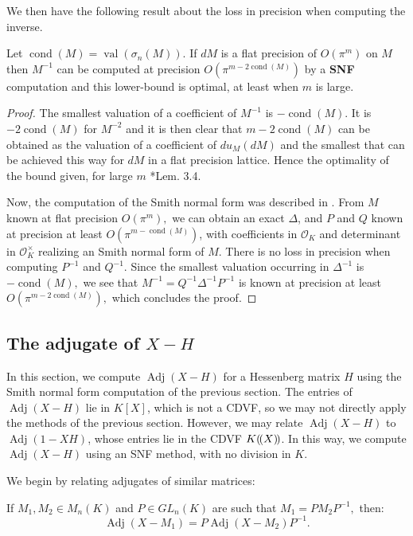 \documentclass{sig-alternate-05-2015}
\DeclareMathOperator{\val}{val}
\DeclareMathOperator{\adj}{Adj}
\DeclareMathOperator{\cond}{cond}
\newcommand{\OK}{\mathcal{O}_K}
\newcommand{\llp}{(\mkern-2.5mu(}
\newcommand{\rrp}{)\mkern-2.5mu)}
\begin{document}
We then have the following result about the loss in precision when computing the inverse.

\begin{prop}
Let $\cond(M) = \val(\sigma_n(M))$.
If $dM$ is a flat precision of $O(\pi^m)$ on $M$ then $M^{-1}$
can be computed at precision $O(\pi^{m-2\cond(M)})$ by a \textbf{SNF} computation
and this lower-bound is optimal,
at least when $m$ is large.
\end{prop}
\begin{proof}
The smallest valuation of a coefficient of $M^{-1}$ is $-\cond(M).$
It is $-2\cond(M)$ for $M^{-2}$ and it is then clear that $m-2\cond(M)$
can be obtained as the valuation of a coefficient of $du_M(dM)$
and the smallest that can be achieved this way for $dM$ in a flat precision lattice.
Hence the optimality of the bound given, for large 
$m$ \cite{caruso-roe-vaccon:14a}*{Lem. 3.4}.

Now, the computation of the Smith normal form was described in \cite{Vaccon-these}.
From $M$ known at flat precision $O(\pi^m),$ we can obtain an exact $\Delta$, and $P$ and $Q$ 
known at precision at least $O(\pi^{m-\cond(M)})$, with coefficients in $\OK$
and determinant in $\OK^\times$ realizing an Smith normal form of $M.$
There is no loss in precision when computing $P^{-1}$ and $Q^{-1}.$
Since the smallest valuation occurring in $\Delta^{-1}$ is $-\cond(M),$
we see that $M^{-1}=Q^{-1} \Delta^{-1} P^{-1}$ is known at precision at least $O(\pi^{m-2\cond(M)}),$
which concludes the proof.
\end{proof}

\subsection{The adjugate of $X{-}H$}

In this section, we compute $\adj(X-H)$ for a Hessenberg matrix $H$
using the Smith normal form computation of the previous section.
The entries of $\adj(X-H)$ lie in $K[X]$, which is not a CDVF,
so we may not directly apply the methods of the previous section.
However, we may relate $\adj(X-H)$ to $\adj(1-XH)$, whose
entries lie in the CDVF $K\llp X\rrp$.  In this way, we compute $\adj(X-H)$
using an SNF method, with no division in $K$.

We begin by relating adjugates of
similar matrices:

\begin{lem} \label{lem:adjugate_of_similar}
If $M_1,M_2 \in M_n(K)$ and $P \in GL_n (K)$ are such that
$M_1=PM_2P^{-1},$ then:
\[ \adj (X-M_1)=P \adj (X-M_2) P^{-1}. \] 
\end{lem}
\end{document}
